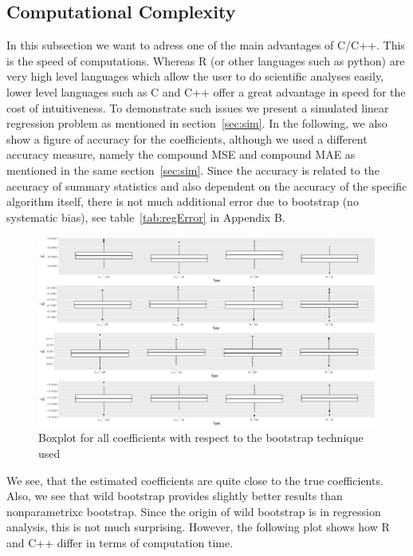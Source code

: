 \subsection{Computational Complexity}

In this subsection we want to adress one of the main advantages of C/C++. This is the speed of computations. Whereas R (or other languages such as python) are very high level languages which allow the user to do scientific analyses easily, lower level languages such as C and C++ offer a great advantage in speed for the cost of intuitiveness. To demonstrate such issues we present a simulated linear regression problem as mentioned in section~\ref{sec:sim}. In the following, we also show a figure of accuracy for the coefficients, although we used a different accuracy measure, namely the compound MSE and compound MAE as mentioned in the same section~\ref{sec:sim}. Since the accuracy is related to the accuracy of summary statistics and also dependent on the accuracy of the specific algorithm itself, there is not much additional error due to bootstrap (no systematic bias), see table~\ref{tab:regError} in Appendix B. 

\begin{figure}
\centering
	\includegraphics[scale=0.4]{./figures/plot_regression_error.pdf}
	\caption[Boxplot Coefficients]{Boxplot for all coefficients with respect to the bootstrap technique used}
	\label{fig:regErr}
\end{figure}

We see, that the estimated coefficients are quite close to the true coefficients. Also, we see that wild bootstrap provides slightly better results than nonparametrixc bootstrap. Since the origin of wild bootstrap is in regression analysis, this is not much surprising. However, the following plot shows how R and C++ differ in terms of computation time.

